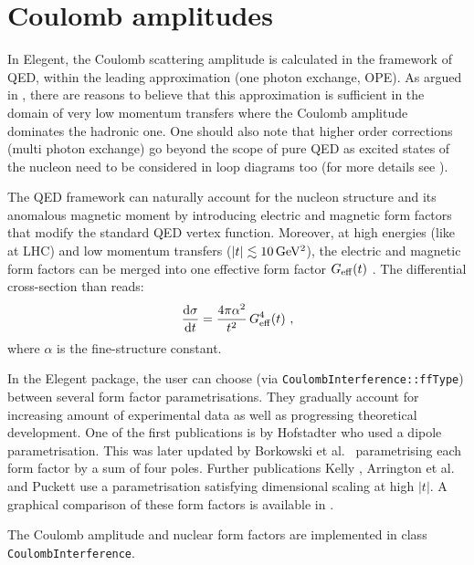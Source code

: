 \documentclass[preprint,12pt]{elsarticle}
\def\d{{\rm d}}
\def\un#1{{\,\rm #1}}
\begin{document}

\section{Coulomb amplitudes}\label{s:coul mod}

In Elegent, the Coulomb scattering amplitude is calculated in the framework of QED, within the leading approximation (one photon exchange, OPE). As argued in \cite[section 1.3.6]{jan_thesis}, there are reasons to believe that this approximation is sufficient in the domain of very low momentum transfers where the Coulomb amplitude dominates the hadronic one. One should also note that higher order corrections (multi photon exchange) go beyond the scope of pure QED as excited states of the nucleon need to be considered in loop diagrams too (for more details see \cite{arrington07,puckett10}).

The QED framework can naturally account for the nucleon structure and its anomalous magnetic moment by introducing electric and magnetic form factors that modify the standard QED vertex function. Moreover, at high energies (like at LHC) and low momentum transfers ($|t| \lesssim 10\un{GeV^2}$), the electric and magnetic form factors can be merged into one effective form factor $G_{\rm eff}(t)$ \cite[equation (31)]{block06}. The differential cross-section than reads:
\begin{equation}
{\d\sigma\over\d t} = {4\pi \alpha^2\over t^2}\, G_{\rm eff}^4(t)\ ,
\end{equation}
where $\alpha$ is the fine-structure constant.

In the Elegent package, the user can choose (via {\tt CoulombInterference::\discretionary{}{}{}ffType}) between several form factor parametrisations. They gradually account for increasing amount of experimental data as well as progressing theoretical development. One of the first publications is by Hofstadter \cite{hofstadter58} who used a dipole parametrisation. This was later updated by Borkowski et al.~\cite{borkowski74,borkowski75} parametrising each form factor by a sum of four poles. Further publications Kelly \cite{kelly04}, Arrington et al.~\cite{arrington07} and Puckett \cite{puckett10} use a parametrisation satisfying dimensional scaling at high $|t|$. A graphical comparison of these form factors is available in \cite[Figure~1.7]{jan_thesis}.

The Coulomb amplitude and nuclear form factors are implemented in class {\tt CoulombInterference}.
\end{document}
